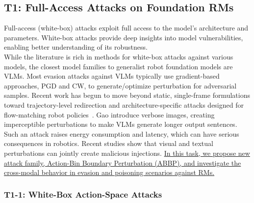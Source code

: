 \documentclass[11pt,letterpaper]{article}
\begin{document}
\subsection{T1: Full-Access Attacks on Foundation RMs} \label{sec:t1}
Full-access (white-box) attacks exploit full access to the model's architecture and parameters.
White-box attacks provide deep insights into model vulnerabilities, enabling better understanding of its robustness.
\\
 While the literature is rich in methods for white-box attacks against various models, the closest model families to generalist robot foundation models are VLMs.
Most evasion attacks against VLMs \cite{schlarmann2023adversarial, bailey2023image,gao2024adversarial,wang2024stop,tan2024wolf} typically use gradient-based approaches, \eg PGD and CW, to generate/optimize perturbation for adversarial samples.
Recent work has begun to move beyond static, single-frame formulations toward trajectory-level redirection and architecture-specific attacks designed for flow-matching robot policies~\cite{puthumanaillam2026trajectory,tae2026drift,zhang2026structure,yin2026vlaguard}.
Gao \etal \cite{gao2024inducing} introduce verbose images, creating imperceptible perturbations to make VLMs generate longer output sentences. Such an attack raises energy consumption and latency, which can have serious consequences in robotics. 
Recent studies \cite{qi2024visual,shayegani2023jailbreak} show that visual and textual perturbations can jointly create malicious injections.
\ul{In this task, we propose new attack family, Action-Bin Boundary Perturbation (ABBP), and investigate the cross-modal behavior in evasion and poisoning scenarios against RMs.}

\subsubsection{T1-1: White-Box Action-Space Attacks} \label{sec:t1_1}
\end{document}
